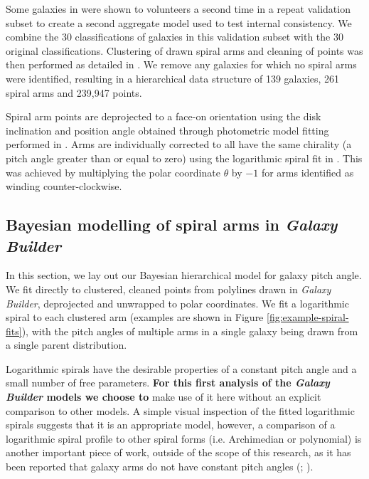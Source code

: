 Some galaxies in \citet{2020arXiv200610450L} were shown to volunteers a second time in a repeat validation subset to create a second aggregate model used to test internal consistency. We combine the 30 classifications of galaxies in this validation subset with the 30 original classifications. Clustering of drawn spiral arms and cleaning of points was then performed as detailed in \citet{2020arXiv200610450L}. We remove any galaxies for which no spiral arms were identified, resulting in a hierarchical data structure of 139 galaxies, 261 spiral arms and 239,947 points.

Spiral arm points are deprojected to a face-on orientation using the disk inclination and position angle obtained through photometric model fitting performed in \citet{2020arXiv200610450L}. Arms are individually corrected to all have the same chirality (a pitch angle greater than or equal to zero) using the logarithmic spiral fit in \citet{2020arXiv200610450L}. This was achieved by multiplying the polar coordinate $\theta$ by $-1$ for arms identified as winding counter-clockwise.

\subsection{Bayesian modelling of spiral arms in \textit{Galaxy Builder}}
\label{section:bhsm-model}
In this section, we lay out our Bayesian hierarchical model for galaxy pitch angle. We fit directly to clustered, cleaned points from polylines drawn in \textit{Galaxy Builder}, deprojected and unwrapped to polar coordinates. We fit a logarithmic spiral to each clustered arm (examples are shown in Figure \ref{fig:example-spiral-fits}), with the pitch angles of multiple arms in a single galaxy being drawn from a single parent distribution.

Logarithmic spirals have the desirable properties of a constant pitch angle and a small number of free parameters. \textbf{For this first analysis of the \textit{Galaxy Builder} models we choose to} make use of it here without an explicit comparison to other models. A simple visual inspection of the fitted logarithmic spirals suggests that it is an appropriate model, however, a comparison of a logarithmic spiral profile to other spiral forms (i.e. Archimedian or polynomial) is another important piece of work, outside of the scope of this research, as it has been reported that galaxy arms do not have constant pitch angles (\citealt{1981AJ.....86.1847K}; \citealt{2009MNRAS.397..164R}).


